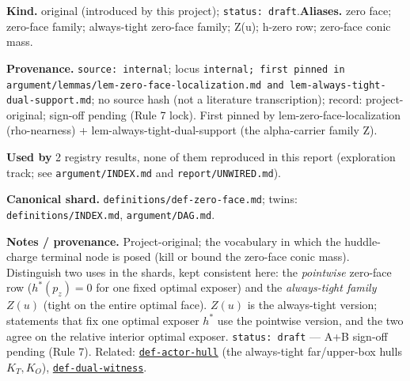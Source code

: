 \begin{defnote}
\textbf{Kind.} original (introduced by this project); \texttt{status: draft}.\quad\textbf{Aliases.} zero face; zero-face family; always-tight zero-face family; Z(u); h-zero row; zero-face conic mass.
\par
\textbf{Provenance.} \texttt{source: internal}; locus \texttt{internal;\allowbreak{} first pinned in argument/\allowbreak{}lemmas/\allowbreak{}lem-\allowbreak{}zero-\allowbreak{}face-\allowbreak{}localization.\allowbreak{}md and lem-\allowbreak{}always-\allowbreak{}tight-\allowbreak{}dual-\allowbreak{}support.\allowbreak{}md}; no source hash (not a literature transcription); record: project-\allowbreak{}original;\allowbreak{} sign-\allowbreak{}off pending (Rule 7 lock).\allowbreak{} First pinned by lem-\allowbreak{}zero-\allowbreak{}face-\allowbreak{}localization (rho-\allowbreak{}nearness) + lem-\allowbreak{}always-\allowbreak{}tight-\allowbreak{}dual-\allowbreak{}support (the alpha-\allowbreak{}carrier family Z).
\par
\textbf{Used by} 2 registry results, none of them reproduced in this report (exploration track; see \texttt{argument/INDEX.md} and \texttt{report/UNWIRED.md}).
\par
\textbf{Canonical shard.} \texttt{definitions/\allowbreak{}def-\allowbreak{}zero-\allowbreak{}face.\allowbreak{}md}; twins: \texttt{definitions/INDEX.md}, \texttt{argument/DAG.md}.
\par
\textbf{Notes / provenance.} Project-original; the vocabulary in which the huddle-charge terminal node
is posed (kill or bound the zero-face conic mass). Distinguish two uses in the shards, kept
consistent here: the \emph{pointwise} zero-face row ($h^*(p_z)=0$ for one fixed optimal exposer) and the
\emph{always-tight family} $Z(u)$ (tight on the entire optimal face). $Z(u)$ is the always-tight version;
statements that fix one optimal exposer $h^*$ use the pointwise version, and the two agree on the
relative interior optimal exposer. \texttt{status:\allowbreak{} draft} --- A+B sign-off pending (Rule 7). Related:
\hyperref[def:actor-hull]{\texttt{def-\allowbreak{}actor-\allowbreak{}hull}} (the always-tight far/upper-box hulls $K_T,K_O$), \hyperref[def:dual-witness]{\texttt{def-\allowbreak{}dual-\allowbreak{}witness}}.
\end{defnote}

